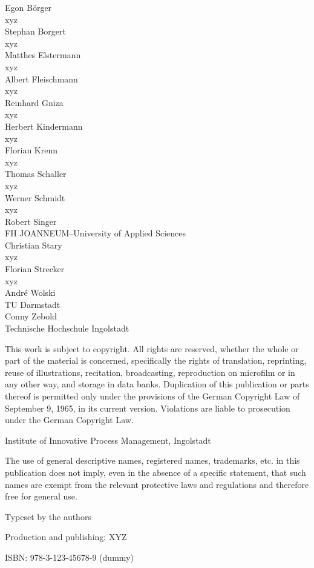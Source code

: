 \documentclass[11pt, showtrims, final, oldfontcommands]{memoir}
\begin{document}
\begingroup
\footnotesize
\setlength{\parindent}{0pt}
\setlength{\parskip}{\baselineskip}
\vspace*{3cm}
\begin{flushleft}
	Egon B\"orger\\
	xyz\\
	\medskip
	Stephan Borgert\\
	xyz\\
	\medskip
	Matthes Elstermann\\
	xyz\\
	\medskip
	Albert Fleischmann\\
	xyz\\
	\medskip
	Reinhard Gniza\\
	xyz\\
	\medskip
	Herbert Kindermann\\
	xyz\\
	\medskip
	Florian Krenn\\
	xyz\\
	\medskip
	Thomas Schaller\\
	xyz\\
	\medskip
	Werner Schmidt\\
	xyz\\
	\medskip
	Robert Singer\\
	FH JOANNEUM--University of Applied Sciences\\
	\medskip
	Christian Stary\\
	xyz\\
	\medskip
	Florian Strecker\\
	xyz\\
	\medskip
	Andr\'e Wolski\\
	TU Darmstadt\\
	\medskip
	Conny Zebold\\
	Technische Hochschule Ingolstadt\\
\end{flushleft}
\vspace*{\fill}
This work is subject to copyright. All rights are reserved, whether the whole or part of the material is concerned, specifically the rights of translation, reprinting, reuse of illustrations, recitation, broadcasting, reproduction on microfilm or in any other way, and storage in data banks. Duplication of this publication or parts thereof is permitted only under the provisions of the German Copyright Law of September 9, 1965, in its current version. Violations
are liable to prosecution under the German Copyright Law.\par
{} Institute of Innovative Process Management, Ingolstadt\par
The use of general descriptive names, registered names, trademarks, etc. in this publication does not imply, even in the absence of a specific statement, that such names are exempt from the relevant protective laws and regulations and therefore free for general use.\par
Typeset by the authors\par
Production and publishing: XYZ\par
ISBN: 978-3-123-45678-9 (dummy)
\endgroup
\clearpage
\end{document}
